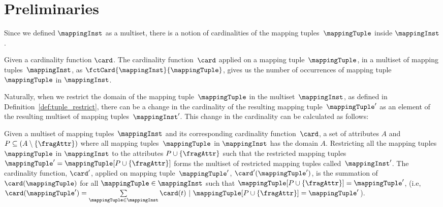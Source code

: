 \section{Preliminaries}%
\label{sec:preliminaries}
Since we defined $\mappingInst$ as a multiset, there is a
notion of cardinalities of the mapping tuples~$\mappingTuple$ inside
$\mappingInst$.


\begin{definition}
	\label{def:cardinality}
	Given a cardinality function $\card$.
	The cardinality function~$\card$ applied on a mapping
	tuple~$\mappingTuple$, in a multiset of mapping tuples~$\mappingInst$, as
	$\fctCard{\mappingInst}{\mappingTuple}$, gives us the number of occurrences
	of mapping tuple~$\mappingTuple$ in
	$\mappingInst$.
\end{definition}


Naturally, when we restrict the domain of the mapping tuple~$\mappingTuple$ in
the multiset~$\mappingInst$, as defined in Definition~\ref{def:tuple_restrict},
there can be a change in the cardinality of the resulting mapping
tuple~$\mappingTuple'$ as an element of the resulting multiset of mapping
tuples~$\mappingInst'$.
This change in the cardinality can be calculated as follows:

\begin{property}
	\label{prop:cardinality_restriction}
	Given a multiset of mapping tuples~$\mappingInst$ and its corresponding cardinality
	function~$\card$, a set of attributes $A$ and $P \subseteq (A
		\setminus \{\fragAttr\})$ where all mapping tuples~$\mappingTuple$ in
	$\mappingInst$ has the domain $A$.
	Restricting all the mapping tuples~$\mappingTuple$ in $\mappingInst$ to the
	attributes $P \cup \{\fragAttr\}$ such that the restricted mapping tuples
	$\mappingTuple' = \mappingTuple[P \cup \{\fragAttr\}]$ forms the multiset
	of restricted mapping tuples called~$\mappingInst'$.
    The cardinality function, $\card'$, applied on mapping
    tuple~$\mappingTuple'$, $\card'(\mappingTuple')$, is the summation of
    $\card(\mappingTuple)$ for all $\mappingTuple \in \mappingInst$ such that
    $\mappingTuple[P \cup \{\fragAttr\}]  = \mappingTuple'$, \break (i.e,
    $\card(\mappingTuple') = \sum\limits_{\mappingTuple \in \mappingInst}
    \card(t) \ | \ \mappingTuple[P \cup \{\fragAttr\}] = \mappingTuple'$). 
\end{property}

